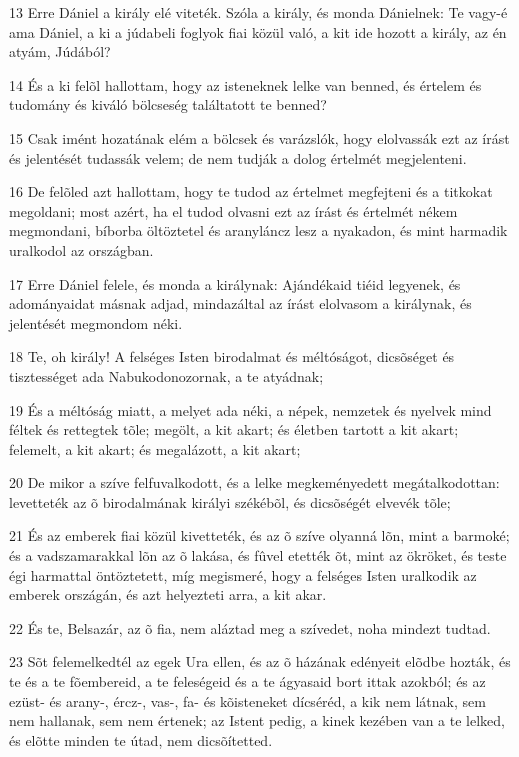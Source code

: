 \par 13 Erre Dániel a király elé viteték. Szóla a király, és monda Dánielnek: Te vagy-é ama Dániel, a ki a júdabeli foglyok fiai közül való, a kit ide hozott a király, az én atyám, Júdából?
\par 14 És a ki felõl hallottam, hogy az isteneknek lelke van benned, és értelem és tudomány és kiváló bölcseség találtatott te benned?
\par 15 Csak imént hozatának elém a bölcsek és varázslók, hogy elolvassák ezt az írást és jelentését tudassák velem; de nem tudják a dolog értelmét megjelenteni.
\par 16 De felõled azt hallottam, hogy te tudod az értelmet megfejteni és a titkokat megoldani; most azért, ha el tudod olvasni ezt az írást és értelmét nékem megmondani, bíborba öltöztetel és aranyláncz lesz a nyakadon, és mint harmadik uralkodol az országban.
\par 17 Erre Dániel felele, és monda a királynak: Ajándékaid tiéid legyenek, és adományaidat másnak adjad, mindazáltal az írást elolvasom a királynak, és jelentését megmondom néki.
\par 18 Te, oh király! A felséges Isten birodalmat és méltóságot, dicsõséget és tisztességet ada Nabukodonozornak, a te atyádnak;
\par 19 És a méltóság miatt, a melyet ada néki, a népek, nemzetek és nyelvek mind féltek és rettegtek tõle; megölt, a kit akart; és életben tartott a kit akart; felemelt, a kit akart; és megalázott, a kit akart;
\par 20 De mikor a szíve felfuvalkodott, és a lelke megkeményedett megátalkodottan: levetteték az õ birodalmának királyi székébõl, és dicsõségét elvevék tõle;
\par 21 És az emberek fiai közül kivetteték, és az õ szíve olyanná lõn, mint a barmoké; és a vadszamarakkal lõn az õ lakása, és fûvel etették õt, mint az ökröket, és teste égi harmattal öntöztetett, míg megismeré, hogy a felséges Isten uralkodik az emberek országán, és azt helyezteti arra, a kit akar.
\par 22 És te, Belsazár, az õ fia, nem aláztad meg a szívedet, noha mindezt tudtad.
\par 23 Sõt felemelkedtél az egek Ura ellen, és az õ házának edényeit elõdbe hozták, és te és a te fõembereid, a te feleségeid és a te ágyasaid bort ittak azokból; és az ezüst- és arany-, ércz-, vas-, fa- és kõisteneket dícséréd, a kik nem látnak, sem nem hallanak, sem nem értenek; az Istent pedig, a kinek kezében van a te  lelked, és elõtte minden te útad, nem dicsõítetted.
